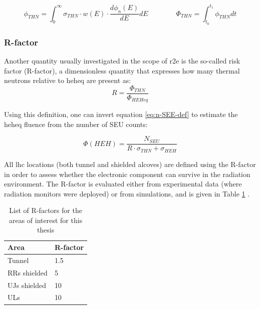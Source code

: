 \documentclass[encoding=utf8,british]{tumphthesis}
\begin{document}
\begin{equation}
    \phi_{THN} = \int_{0}^{\infty} \sigma_{THN} \cdot w(E) \cdot \frac{d\phi_n (E)}{dE} dE 
    \qquad \qquad
    \Phi_{THN} = \int_{t_0}^{t_1}\phi_{THN} dt
\end{equation}



\subsubsection{R-factor}

Another quantity usually investigated in the scope of \acrshort{r2e} is the so-called risk factor (R-factor), a dimensionless quantity that expresses how many thermal neutrons relative to \acrshort{heheq} are present as:
\begin{equation}
    R = \frac{\Phi_{THN}}{\Phi_{HEHeq}}
\end{equation}


Using this definition, one can invert equation \ref{eq:n-SEE-def} to estimate the \acrshort{heheq} fluence from the number of SEU counts:

\begin{equation}
    \Phi(HEH) = \frac{N_{SEU}}{R \cdot \sigma_{THN} + \sigma_{HEH}}
    \label{eq:HEH-from-SEU}
\end{equation}


\begin{minipage}[t]{0.55\linewidth}


All \acrshort{lhc} locations (both tunnel and shielded alcoves) are defined using the R-factor in order to assess whether the electronic component can survive in the radiation environment. The R-factor is evaluated either from experimental data (where radiation monitors were deployed) or from simulations, and is given in Table \ref{tab:R-factor-values} \cite{Martinella:2652458}.

\end{minipage}
\hfill
\begin{minipage}[t]{0.35\linewidth}
\vspace{-1cm}

\begin{table}[H]
\centering
\caption{List of R-factors for the areas of interest for this thesis}
\label{tab:R-factor-values}
\begin{tabular}{|l|l|}
\hline 
Area                & R-factor \\ \hline
Tunnel              & 1.5      \\
RRs shielded        & 5        \\
UJs shielded        & 10       \\
ULs                 & 10       \\ \hline
\end{tabular}
\end{table}

\end{minipage}
\end{document}
